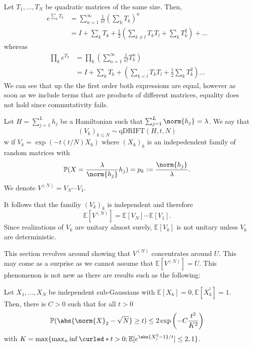 \begin{exm}[]
    Let \( T_1, \dots, T_N \) be quadratic matrices of the same size. Then,
    \begin{align*}
      e^{\sum_{k}^{} T_k} &= \sum_{n=1}^{\infty} \frac{1}{n!} \left(\sum_{k}^{}T_k\right)^{n} \\
                          &= I + \sum_{k}^{} T_k + \frac{1}{2}\left(\sum_{k\neq l} T_kT_l+\sum_{k}^{}T_k^{2}\right) + \dots 
    \end{align*}
    whereas
    \begin{align*}
      \prod_{k}^{}e^{T_k} &= \prod_{k}^{}\left(\sum_{n=1}^{\infty}\frac{1}{n!}T_k^{n}\right) \\
                          &=I + \sum_{k}^{} T_k + \left(\sum_{k<l}^{}T_kT_l + \frac{1}{2} \sum_{k}^{}T_k^{2}\right) \dots
    \end{align*}
    We can see that up the the first order both expressions are equal, however as soon as we include terms that are products of different matrices, equality does not hold since commutativity fails. 
\end{exm}

\begin{defn}[qDRIFT]
  Let \( H= \sum_{j=1}^{L} h_j \) be a Hamiltonian such that \( \sum_{j=1}^{L} \norm{h_j}_{}= \lambda \). We say that 
  \[ (V_k)_{k \leq N} \sim \text{qDRIFT}(H,t,N)\] w
  if  \( V_k = \operatorname{exp}\left(-t\left(t/N\right)X_k\right) \) where \( (X_k)_k \) is an indepedendent family of random matrices with
  \[ \mathbb{P}(X= \frac{\lambda}{\norm{h_j}_{}}h_j)= p_k := \frac{\norm{h_j}_{}}{\lambda}.\]
  We denote \( V^{(N)}=V_N \cdots V_1 \).
\end{defn}

It follows that the familiy \( \left(V_k\right)_k \) is independent and therefore 
\[ \mathbb{E}\left[V^{(N)}\right] = \mathbb{E}\left[V_N\right] \cdots \mathbb{E}\left[V_1\right] .\]
Since realizations of \( V_k \) are unitary almost surely, \( \mathbb{E}[V_k] \) is not unitary unless \( V_k \) are deterministic. 

This section revolves around showing that \( V^{(N)} \) concentrates around \( U \). This may come as a surprise as we cannot assume that \( \mathbb{E}\left[V^{(N)}\right] = U \). This phenomenon is not new as there are results such as the following:

\begin{thm}
  Let \(X_1,\dots, X_N\) be independent sub-Gaussians with \( \mathbb{E}\left[X_k\right]=0, \mathbb{E}\left[X_k^{^2}\right]=1 \). Then, there is \(C>0\) such that for all \(t>0\)
  \[\mathbb{P}(\abs{\norm{X}_2-\sqrt{N}}\geq t) \leq 2 \exp\left({-C\frac{t^2}{K^2}}\right)\]
with \(K=\max\{\max_n \inf \curled*{t>0 ; \mathbb{E}[e^{\abs{X_j^2-1}/t}]\leq 2},1\}\).
  
\end{thm}

